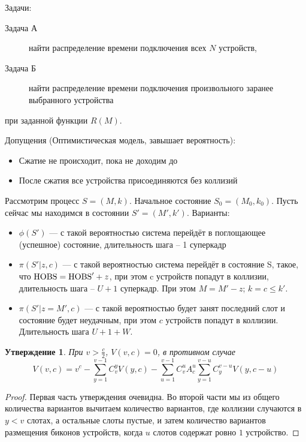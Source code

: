 Задачи:
\begin{description}
\item[Задача А] найти распределение времени подключения всех $N$ устройств,
\item[Задача Б] найти распределение времени подключения произвольного заранее выбранного устройства
\end{description}

при заданной функции $R(M)$.

Допущения (Оптимистическая модель, завышает вероятность):
\begin{itemize}
\item Сжатие не происходит, пока не доходим до \MaxBP
\item После сжатия все устройства присоединяются без коллизий
\end{itemize}

Рассмотрим процесс $S = (M, k)$. Начальное состояние $S_0 = (M_0, k_0)$. Пусть сейчас мы находимся в состоянии $S' = (M', k')$.
Варианты:
\begin{itemize}
\item $\phi(S')$ --- с такой вероятностью система перейдёт в поглощающее (успешное) состояние, длительность шага -- 1 суперкадр
\item $\pi(S' |z, c)$ --- с такой вероятностью система перейдёт в состояние S, такое, что $\text{HOBS} = \text{HOBS}' + z$, при этом c устройств попадут в коллизии, длительность шага -- $U+1$ суперкадр. При этом $M = M' - z$; $k = c \le k'$.
\item $\pi(S'|z=M', c)$ --- с такой вероятностью будет занят последний слот и состояние будет неудачным, при этом $c$ устройств попадут в коллизии. Длительность шага $U+1+W$.
\end{itemize}

\newtheorem{wimedia1}{Утверждение}
\begin{wimedia1}
При $v > \frac{c}{2}$, $V(v, c) = 0$, в противном случае
$$ V(v,c) = v^c - \sum_{y = 1}^{v-1} C_{v}^{y} V(y, c) - \sum_{u = 1}^{v-1} C_{v}^{u} A_{c}^{u}  \sum_{y = 1}^{v-u} C_{y}^{v-u} V(y, c-u) $$
\end{wimedia1}

\begin{proof}
Первая часть утверждения очевидна. Во второй части мы из общего количества вариантов вычитаем количество вариантов, где коллизии случаются в $y < v$ слотах, а остальные слоты пустые, и затем количество вариантов размещения биконов устройств, когда $u$ слотов содержат ровно $1$ устройство.
\end{proof}

